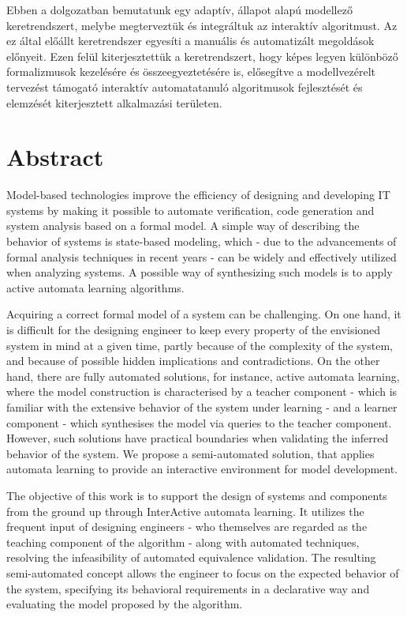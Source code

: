 Ebben a dolgozatban bemutatunk egy adaptív, állapot alapú modellező keretrendszert, melybe megterveztük és integráltuk az interaktív algoritmust. Az ez által előállt keretrendszer egyesíti a manuális és automatizált megoldások előnyeit. Ezen felül kiterjesztettük a keretrendszert, hogy képes legyen különböző formalizmusok kezelésére és összeegyeztetésére is, elősegítve a modellvezérelt tervezést támogató interaktív automatatanuló algoritmusok fejlesztését és elemzését kiterjesztett alkalmazási területen.


\vfill
\selectenglish


\chapter*{Abstract}

Model-based technologies improve the efficiency of designing and developing IT systems by making it possible to automate verification, code generation and system analysis based on a formal model. A simple way of describing the behavior of systems is state-based modeling, which - due to the advancements of formal analysis techniques in recent years - can be widely and effectively utilized when analyzing systems. A possible way of synthesizing such models is to apply active automata learning algorithms.

Acquiring a correct formal model of a system can be challenging. On one hand, it is difficult for the designing engineer to keep every property of the envisioned system in mind at a given time, partly because of the complexity of the system, and because of possible hidden implications and contradictions. On the other hand, there are fully automated solutions, for instance, active automata learning, where the model construction is characterised by a teacher component - which is familiar with the extensive behavior of the system under learning - and a learner component - which synthesises the model via queries to the teacher component. However, such solutions have practical boundaries when validating the inferred behavior of the system. We propose a semi-automated solution, that applies automata learning to provide an interactive environment for model development.

The objective of this work is to support the design of systems and components from the ground up through InterActive automata learning. It utilizes the frequent input of designing engineers - who themselves are regarded as the teaching component of the algorithm - along with automated techniques, resolving the infeasibility of automated equivalence validation. The resulting semi-automated concept allows the engineer to focus on the expected behavior of the system, specifying its behavioral requirements in a declarative way and evaluating the model proposed by the algorithm.

